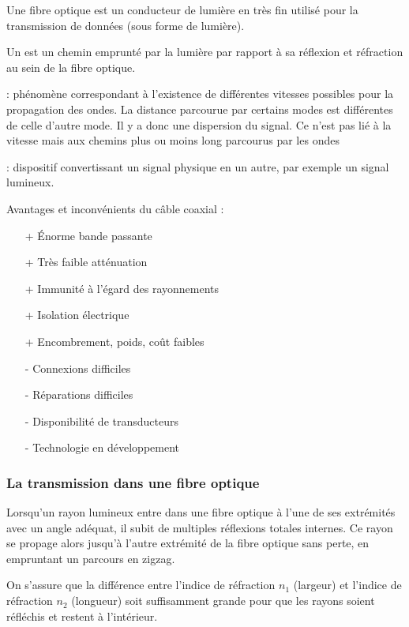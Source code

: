 Une fibre optique est un conducteur de lumière en  très fin utilisé pour la transmission de données (sous forme de lumière).

Un  est un chemin emprunté par la lumière par rapport à sa réflexion et réfraction au sein de la fibre optique.

 : phénomène correspondant à l'existence de différentes vitesses possibles pour la propagation des ondes. La distance parcourue par certains modes est différentes de celle d'autre mode. Il y a donc une dispersion du signal. Ce n'est pas lié à la vitesse mais aux chemins plus ou moins long parcourus par les ondes

 : dispositif convertissant un signal physique en un autre, par exemple un signal lumineux.

Avantages et inconvénients du câble coaxial :
\begin{itemize}
	\item[+] Énorme bande passante
	\item[+] Très faible atténuation
	\item[+] Immunité à l'égard des rayonnements
	\item[+] Isolation électrique
	\item[+] Encombrement, poids, coût faibles
	\item[-] Connexions difficiles
	\item[-] Réparations difficiles
	\item[-] Disponibilité de transducteurs
	\item[-] Technologie en développement
\end{itemize}

\newpage
\subsubsection{La transmission dans une fibre optique}

Lorsqu'un rayon lumineux entre dans une fibre optique à l'une de ses extrémités avec un angle adéquat, il subit de multiples réflexions totales internes. Ce rayon se propage alors jusqu'à l'autre extrémité de la fibre optique sans perte, en empruntant un parcours en zigzag.

On s'assure que la différence entre l'indice de réfraction $n_1$ (largeur) et l'indice de réfraction $n_2$ (longueur) soit suffisamment grande pour que les rayons soient réfléchis et restent à l'intérieur.

